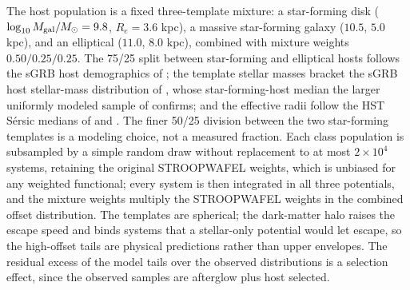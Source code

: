 \documentclass[twocolumn,apj]{openjournal}
\newcommand{\Msun}{M_\odot}
\begin{document}
The host population is a fixed three-template mixture: a star-forming disk
($\log_{10} M_{\rm gal}/\Msun = 9.8$, $R_e = 3.6$ kpc), a massive
star-forming galaxy ($10.5$, $5.0$ kpc), and an elliptical ($11.0$, $8.0$
kpc), combined with mixture weights $0.50/0.25/0.25$. The 75/25 split between
star-forming and elliptical hosts follows the sGRB host demographics of
\citet{fong2013}; the template stellar masses bracket the sGRB host
stellar-mass distribution of \citet{leibler2010}, whose star-forming-host
median the larger uniformly modeled sample of \citet{nugent2022} confirms;
and the effective radii follow the HST S\'ersic medians of \citet{fong2013}
and \citet{fong2022}. The finer 50/25 division between the two star-forming
templates is a modeling choice, not a measured fraction. Each class
population is subsampled by a simple random draw without replacement to at most
$2 \times 10^4$ systems, retaining the original STROOPWAFEL weights, which is
unbiased for any weighted functional; every system is then integrated in all
three potentials, and the mixture weights multiply the STROOPWAFEL weights in
the combined offset distribution.
The templates are spherical; the dark-matter halo raises the escape speed and
binds systems that a stellar-only potential would let escape, so the
high-offset tails are physical predictions rather than upper envelopes. The
residual excess of the model tails over the observed distributions is a
selection effect, since the observed samples are afterglow plus host
selected.
\end{document}
